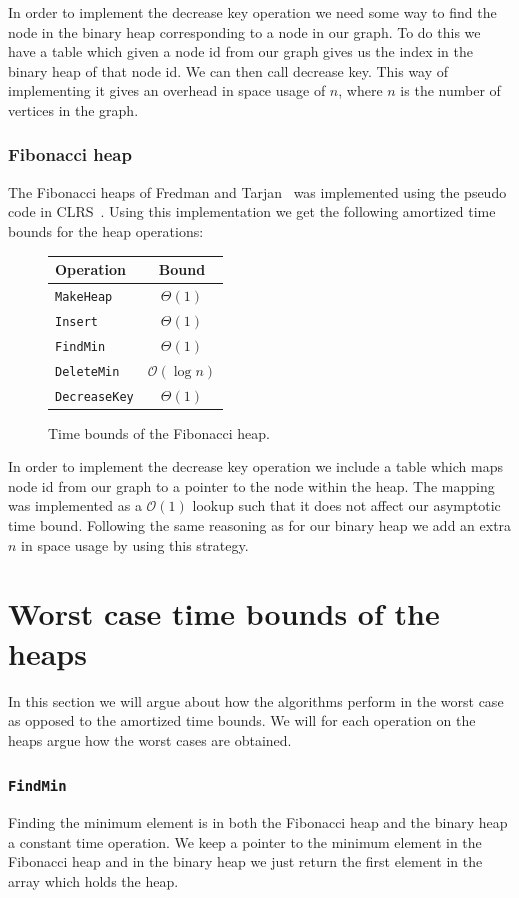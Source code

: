 \documentclass[a4paper,oneside,article,11pt]{memoir}
\begin{document}
In order to implement the decrease key operation we need some way to find the node in the binary heap corresponding to a node in our graph. To do this we have a table which given a node id from our graph gives us the index in the binary heap of that node id. We can then call decrease key. This way of implementing it gives an overhead in space usage of $n$, where $n$ is the number of vertices in the graph.

\subsection{Fibonacci heap}

The Fibonacci heaps of Fredman and Tarjan~\cite{fred87} was implemented using the pseudo code in CLRS~\cite[p.~505-522]{clrs}. Using this implementation we get the following amortized time bounds for the heap operations:

\begin{figure}[H]
\centering
\begin{tabular}{l|c}
Operation & Bound \\\hline
\texttt{MakeHeap} & $\Theta(1)$ \\\hline
\texttt{Insert} & $\Theta(1)$ \\\hline
\texttt{FindMin} & $\Theta(1)$ \\\hline
\texttt{DeleteMin} & $\mathcal{O}(\log n)$\\\hline
\texttt{DecreaseKey} & $\Theta(1)$
\end{tabular}
\caption{Time bounds of the Fibonacci heap.}
\end{figure}

In order to implement the decrease key operation we include a table which maps node id from our graph to a pointer to the node within the heap. The mapping was implemented as a $\mathcal{O}(1)$ lookup such that it does not affect our asymptotic time bound. Following the same reasoning as for our binary heap we add an extra $n$ in space usage by using this strategy.

\chapter{Worst case time bounds of the heaps}
\label{cpt:worst_case_bounds}
In this section we will argue about how the algorithms perform in the worst case as opposed to the amortized time bounds. We will for each operation on the heaps argue how the worst cases are obtained.

\subsection{\texttt{FindMin}}
Finding the minimum element is in both the Fibonacci heap and the binary heap a constant time operation. We keep a pointer to the minimum element in the Fibonacci heap and in the binary heap we just return the first element in the array which holds the heap.
\end{document}
